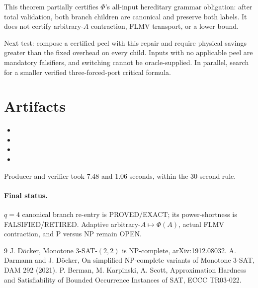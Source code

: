\documentclass[11pt]{article}
\newcommand{\status}[1]{\textsf{#1}}
\begin{document}
This theorem partially certifies $\Phi$'s all-input hereditary grammar obligation: after total validation, both branch children are canonical and preserve both labels.  It does not certify arbitrary-$A$ contraction, FLMV transport, or a lower bound.

Next test: compose a certified peel with this repair and require physical savings greater than the fixed overhead on every child.  Inputs with no applicable peel are mandatory falsifiers, and switching cannot be oracle-supplied.  In parallel, search for a smaller verified three-forced-port critical formula.

\section{Artifacts}
\begin{itemize}
\item {}
\item {}
\item {}
\item {}
\end{itemize}
Producer and verifier took 7.48 and 1.06 seconds, within the 30-second rule.

\paragraph{Final status.}
$q=4$ canonical branch re-entry is \status{PROVED/EXACT}; its power-shortness is \status{FALSIFIED/RETIRED}.  Adaptive arbitrary-$A\mapsto\Phi(A)$, actual FLMV contraction, and P versus NP remain \status{OPEN}.

\begin{thebibliography}{9}
 J. D\"ocker, Monotone 3-SAT-$(2,2)$ is NP-complete, arXiv:1912.08032.
 A. Darmann and J. D\"ocker, On simplified NP-complete variants of Monotone 3-SAT, DAM 292 (2021).
 P. Berman, M. Karpinski, A. Scott, Approximation Hardness and Satisfiability of Bounded Occurrence Instances of SAT, ECCC TR03-022.
\end{thebibliography}

\end{document}
